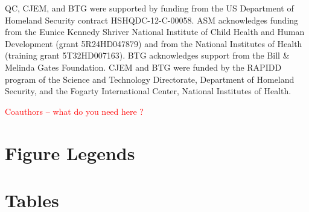 \documentclass[10pt]{article}
\begin{document}
QC, CJEM, and BTG were supported by funding from the US Department of Homeland Security contract HSHQDC-12-C-00058. ASM acknowledges funding from the Eunice Kennedy Shriver National Institute of Child Health and Human Development (grant 5R24HD047879) and from the National Institutes of Health (training grant 5T32HD007163). BTG acknowledges support from the Bill \& Melinda Gates Foundation. CJEM and BTG were funded by the RAPIDD program of the Science and Technology Directorate, Department of Homeland Security, and the Fogarty International Center, National Institutes of Health. 

\textcolor{red}{Coauthors -- what do you need here ?}









\section*{Figure Legends}


\section*{Tables}
\end{document}
